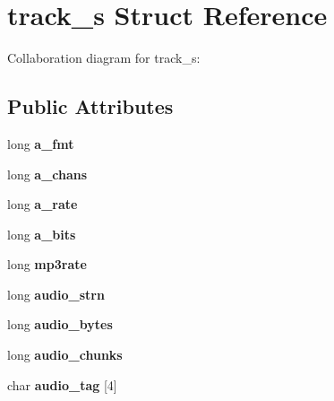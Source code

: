 \hypertarget{structtrack__s}{\section{track\+\_\+s Struct Reference}
\label{structtrack__s}
}


Collaboration diagram for track\+\_\+s\+:
\subsection*{Public Attributes}
\begin{DoxyCompactItemize}
\item 
\hypertarget{structtrack__s_a3b0a099fdf0de247fcb6dad94fd545d2}{long {\bfseries a\+\_\+fmt}}\label{structtrack__s_a3b0a099fdf0de247fcb6dad94fd545d2}

\item 
\hypertarget{structtrack__s_a444558de22c6273e1a4b581f055a4667}{long {\bfseries a\+\_\+chans}}\label{structtrack__s_a444558de22c6273e1a4b581f055a4667}

\item 
\hypertarget{structtrack__s_a5ff506b60e17899382cdc394ec2b605b}{long {\bfseries a\+\_\+rate}}\label{structtrack__s_a5ff506b60e17899382cdc394ec2b605b}

\item 
\hypertarget{structtrack__s_a352c72345388a36d2e7a4d99ceba8e06}{long {\bfseries a\+\_\+bits}}\label{structtrack__s_a352c72345388a36d2e7a4d99ceba8e06}

\item 
\hypertarget{structtrack__s_a3872211e945321c11f6066a15c9db0ef}{long {\bfseries mp3rate}}\label{structtrack__s_a3872211e945321c11f6066a15c9db0ef}

\item 
\hypertarget{structtrack__s_a15d2c67dc510c6c597b6d47422654767}{long {\bfseries audio\+\_\+strn}}\label{structtrack__s_a15d2c67dc510c6c597b6d47422654767}

\item 
\hypertarget{structtrack__s_a9142219bbd27be9ea00f5f07d7fb9142}{long {\bfseries audio\+\_\+bytes}}\label{structtrack__s_a9142219bbd27be9ea00f5f07d7fb9142}

\item 
\hypertarget{structtrack__s_abcc4e4c18bb7fbf5e4e50f1bf24dc716}{long {\bfseries audio\+\_\+chunks}}\label{structtrack__s_abcc4e4c18bb7fbf5e4e50f1bf24dc716}

\item 
\hypertarget{structtrack__s_a420447e7c5adc9d4c4aee7348fbe0935}{char {\bfseries audio\+\_\+tag} \mbox{[}4\mbox{]}}\label{structtrack__s_a420447e7c5adc9d4c4aee7348fbe0935}


\end{DoxyCompactItemize}
